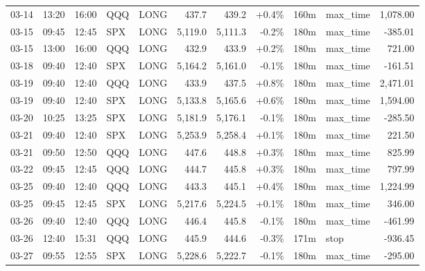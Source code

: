 \documentclass[11pt,a4paper,twoside]{article}
\begin{document}
\begin{center}
\begin{longtable}{>{\color{txtmain}}l l l l l r r r r >{\color{txtmain}}l r}
03-14 & 13:20 & 16:00 & QQQ & LONG & 437.7 & 439.2 & \textcolor{wingreen}{+0.4\%} & 160m & max\_time & \textcolor{wingreen}{1,078.00} \\
03-15 & 09:45 & 12:45 & SPX & LONG & 5,119.0 & 5,111.3 & \textcolor{lossred}{-0.2\%} & 180m & max\_time & \textcolor{lossred}{-385.01} \\
03-15 & 13:00 & 16:00 & QQQ & LONG & 432.9 & 433.9 & \textcolor{wingreen}{+0.2\%} & 180m & max\_time & \textcolor{wingreen}{721.00} \\
03-18 & 09:40 & 12:40 & SPX & LONG & 5,164.2 & 5,161.0 & \textcolor{lossred}{-0.1\%} & 180m & max\_time & \textcolor{lossred}{-161.51} \\
03-19 & 09:40 & 12:40 & QQQ & LONG & 433.9 & 437.5 & \textcolor{wingreen}{+0.8\%} & 180m & max\_time & \textcolor{wingreen}{2,471.01} \\
03-19 & 09:40 & 12:40 & SPX & LONG & 5,133.8 & 5,165.6 & \textcolor{wingreen}{+0.6\%} & 180m & max\_time & \textcolor{wingreen}{1,594.00} \\
03-20 & 10:25 & 13:25 & SPX & LONG & 5,181.9 & 5,176.1 & \textcolor{lossred}{-0.1\%} & 180m & max\_time & \textcolor{lossred}{-285.50} \\
03-21 & 09:40 & 12:40 & SPX & LONG & 5,253.9 & 5,258.4 & \textcolor{wingreen}{+0.1\%} & 180m & max\_time & \textcolor{wingreen}{221.50} \\
03-21 & 09:50 & 12:50 & QQQ & LONG & 447.6 & 448.8 & \textcolor{wingreen}{+0.3\%} & 180m & max\_time & \textcolor{wingreen}{825.99} \\
03-22 & 09:45 & 12:45 & QQQ & LONG & 444.7 & 445.8 & \textcolor{wingreen}{+0.3\%} & 180m & max\_time & \textcolor{wingreen}{797.99} \\
03-25 & 09:40 & 12:40 & QQQ & LONG & 443.3 & 445.1 & \textcolor{wingreen}{+0.4\%} & 180m & max\_time & \textcolor{wingreen}{1,224.99} \\
03-25 & 09:45 & 12:45 & SPX & LONG & 5,217.6 & 5,224.5 & \textcolor{wingreen}{+0.1\%} & 180m & max\_time & \textcolor{wingreen}{346.00} \\
03-26 & 09:40 & 12:40 & QQQ & LONG & 446.4 & 445.8 & \textcolor{lossred}{-0.1\%} & 180m & max\_time & \textcolor{lossred}{-461.99} \\
03-26 & 12:40 & 15:31 & QQQ & LONG & 445.9 & 444.6 & \textcolor{lossred}{-0.3\%} & 171m & stop & \textcolor{lossred}{-936.45} \\
03-27 & 09:55 & 12:55 & SPX & LONG & 5,228.6 & 5,222.7 & \textcolor{lossred}{-0.1\%} & 180m & max\_time & \textcolor{lossred}{-295.00} \\

\end{longtable}
\end{center}
\end{document}
